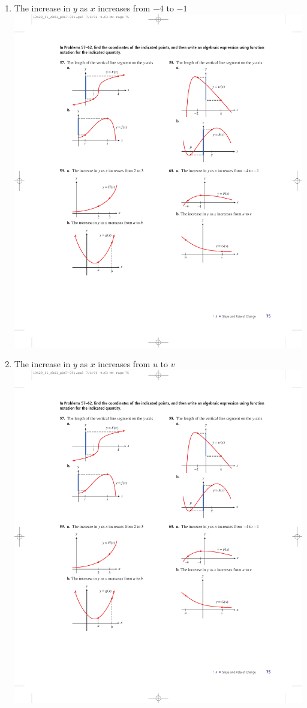 \documentclass[10pt,]{book}
\theoremstyle{plain}
\theoremstyle{definition}
\theoremstyle{definition}
\theoremstyle{definition}
\theoremstyle{definition}
\numberwithin{equation}{part}
\begin{document}
\begin{exercisegroup}
\begin{multicols}{2}
\begin{enumerate}[label=*\alph**]
\item\hypertarget{li-1082}{}The increase in \(y\) as \(x\) increases from \(-4\) to \(-1\) \includegraphics[width=0.8\linewidth]{images/fig-ex-1-4-60a}
%
\item\hypertarget{li-1083}{}The increase in \(y\) as \(x\) increases from \(u\) to \(v\) \includegraphics[width=0.8\linewidth]{images/fig-ex-1-4-60b}

\end{enumerate}
\end{multicols}
\end{exercisegroup}
\end{document}
